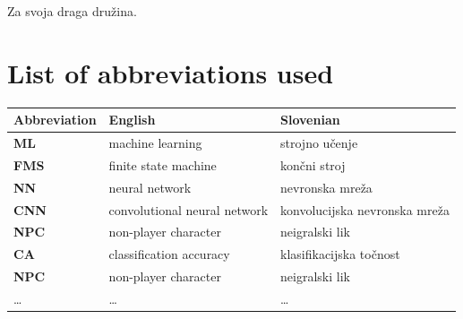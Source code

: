 \documentclass[a4paper, 12pt]{book}
\newcommand{\clearemptydoublepage}{\newpage{\pagestyle{empty}\cleardoublepage}}
\begin{document}
\thispagestyle{empty}\mbox{}{\textheight}\mbox{}\hfill\begin{minipage}{0.55\textwidth}%
Za svoja draga družina.
\normalfont\end{minipage}

\clearemptydoublepage


\pagestyle{empty}
\def\thepage{}%
\tableofcontents{}


\clearemptydoublepage



\chapter*{List of abbreviations used}  %

\noindent\begin{tabular}{p{}|p{}|p{}}    %
  {\bf Abbreviation} & {\bf English} & {\bf Slovenian} \\ \hline
  {\bf ML}      & machine learning                  & strojno učenje \\
  {\bf FMS}     & finite state machine              & končni stroj \\
  {\bf NN}      & neural network                    & nevronska mreža \\
  {\bf CNN}     & convolutional neural network      & konvolucijska nevronska mreža \\
  {\bf NPC}     & non-player character              & neigralski lik \\
  {\bf CA}      & classification accuracy           & klasifikacijska točnost \\
  {\bf NPC }    & non-player character              & neigralski lik \\
  \dots         & \dots                             & \dots \\
\end{tabular}
\end{document}
